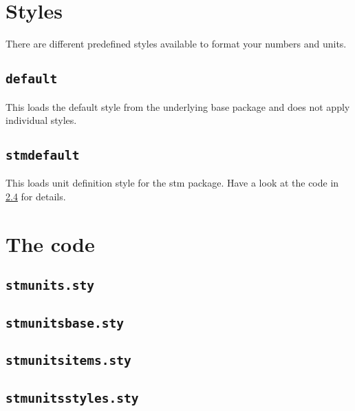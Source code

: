 \documentclass[%
  type=article,%
  layout=koma,%
  cleveref=true,%
  conditionallox=true,%
  conditionalloxnewpage=false,%
  date=true,%
  hyperref=true,%
  index=true,%
  listings=true,%
  math=true,%
]{stmtext}
\begin{document}
\section{Styles}
\label{sec:styles}

There are different predefined styles available to format your numbers and units.

\subsection{\protect\texttt{default}}
\label{sec:styles:default}

This loads the default style from the underlying base package and does not apply individual styles.

\subsection{\protect\texttt{stmdefault}}
\label{sec:styles:stmdefault}

This loads unit definition style for the stm package. Have a look at the code in \cref{sec:code:styles} for details.

\printstmindex

\newpage
\appendix

\section{The code}
\label{sec:code}

\subsection{\protect\texttt{stmunits.sty}}
\label{sec:code:main}



\subsection{\protect\texttt{stmunitsbase.sty}}
\label{sec:code:base}



\subsection{\protect\texttt{stmunitsitems.sty}}
\label{sec:code:items}



\subsection{\protect\texttt{stmunitsstyles.sty}}
\label{sec:code:styles}


\end{document}

